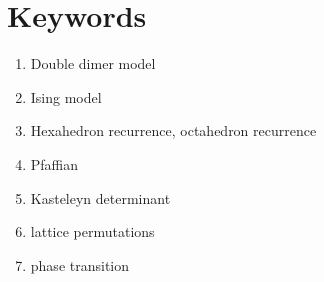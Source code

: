 \chapter{Keywords}

\begin{enumerate}
	\item Double dimer model
	\item Ising model
	\item Hexahedron recurrence, octahedron recurrence
	\item Pfaffian
	\item Kasteleyn determinant
	\item lattice permutations
	\item phase transition
\end{enumerate}